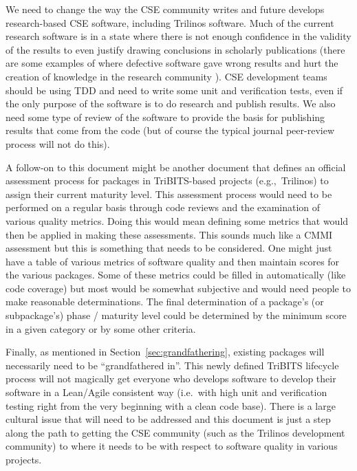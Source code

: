 \documentclass[11pt]{SANDreport}
\begin{document}
We need to change the way the CSE community writes and future develops
research-based CSE software, including Trilinos software.  Much of the
current research software is in a state where there is not enough
confidence in the validity of the results to even justify drawing
conclusions in scholarly publications (there are some examples of
where defective software gave wrong results and hurt the creation of
knowledge in the research community
{}\cite{ScientistsNightmareFiveRetractions2006}).  CSE development
teams should be using TDD and need to write some unit and verification
tests, even if the only purpose of the software is to do research and
publish results.  We also need some type of review of the software to
provide the basis for publishing results that come from the code (but
of course the typical journal peer-review process will not do this).

A follow-on to this document might be another document that defines an
official assessment process for packages in TriBITS-based projects
(e.g.,\ Trilinos) to assign their current maturity level.  This
assessment process would need to be performed on a regular basis
through code reviews and the examination of various quality metrics.
Doing this would mean defining some metrics that would then be applied
in making these assessments. This sounds much like a CMMI assessment
but this is something that needs to be considered.  One might just
have a table of various metrics of software quality and then maintain
scores for the various packages.  Some of these metrics could be
filled in automatically (like code coverage) but most would be
somewhat subjective and would need people to make reasonable
determinations.  The final determination of a package's (or
subpackage's) phase / maturity level could be determined by the
minimum score in a given category or by some other criteria.

Finally, as mentioned in Section~\ref{sec:grandfathering}, existing
packages will necessarily need to be ``grandfathered in''.  This newly
defined TriBITS lifecycle process will not magically get everyone who
develops software to develop their software in a Lean/Agile consistent
way (i.e.\ with high unit and verification testing right from the very
beginning with a clean code base).  There is a large cultural issue
that will need to be addressed and this document is just a step along
the path to getting the CSE community (such as the Trilinos development
community) to where it needs to be with respect to software quality in
various projects.
\end{document}
